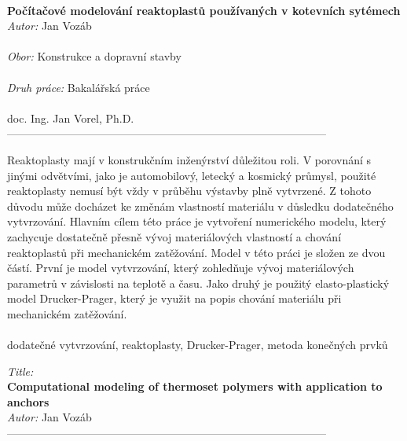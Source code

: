 \thispagestyle{empty}

\\
{\bf Počítačové modelování reaktoplastů používaných v kotevních sytémech}\\

\noindent
{\it Autor:} Jan Vozáb  \\
\\
\noindent
{\it Obor:}       Konstrukce a dopravní stavby\\
\\
\noindent
{\it Druh práce:} Bakalářská práce\\
\\
 doc. Ing. Jan Vorel, Ph.D.\\   --------------------------------------------------------------------------------------- \\


Reaktoplasty mají v konstrukčním inženýrství důležitou roli. V porovnání s jinými odvětvími, jako je automobilový, letecký a kosmický průmysl, použité reaktoplasty nemusí být vždy v průběhu výstavby plně vytvrzené. Z tohoto důvodu může docházet ke změnám vlastností materiálu v důsledku dodatečného vytvrzování. Hlavním cílem této práce je vytvoření numerického modelu, který zachycuje dostatečně přesně vývoj materiálových vlastností a chování reaktoplastů při mechanickém zatěžování. Model v této práci je složen ze dvou částí. První je model vytvrzování, který zohledňuje vývoj materiálových parametrů v závislosti na teplotě a času. Jako druhý je použitý elasto-plastický model Drucker-Prager, který je využit na popis chování materiálu při mechanickém zatěžování.
\\
\\

 dodatečné vytvrzování, reaktoplasty, Drucker-Prager, metoda konečných prvků

 \newpage
\thispagestyle{empty}
 \noindent
{\it Title:}\\
{\bf Computational modeling of thermoset polymers with application to anchors}\\

\noindent
{\it Autor:} Jan Vozáb \\
 
--------------------------------------------------------------------------------------- \\

